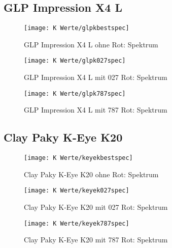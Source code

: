 \documentclass[pagesize,paper=A4,fontsize=12pt,utf8,numbers=noenddot,bibliography=totoc,listof=totoc,DIV=11,BCOR=1mm]{scrreprt}
\begin{document}
\subsection{GLP Impression X4 L}

\begin{figure}[htp]     %
\centering
\texttt{[image: K Werte/glpkbestspec]} 
\caption {GLP Impression X4 L ohne Rot: Spektrum} 
\end{figure}

\begin{figure}[htp]     %
\centering
\texttt{[image: K Werte/glpk027spec]} 
\caption {GLP Impression X4 L mit 027 Rot: Spektrum} 
\end{figure}

\begin{figure}[htp]     %
\centering
\texttt{[image: K Werte/glpk787spec]} 
\caption {GLP Impression X4 L mit 787 Rot: Spektrum} 
\end{figure}


\subsection{Clay Paky K-Eye K20}

\begin{figure}[htp]     %
\centering
\texttt{[image: K Werte/keyekbestspec]} 
\caption {Clay Paky K-Eye K20 ohne Rot: Spektrum} 
\end{figure}

\begin{figure}[htp]     %
\centering
\texttt{[image: K Werte/keyek027spec]} 
\caption {Clay Paky K-Eye K20 mit 027 Rot: Spektrum} 
\end{figure}

\begin{figure}[htp]     %
\centering
\texttt{[image: K Werte/keyek787spec]} 
\caption {Clay Paky K-Eye K20 mit 787 Rot: Spektrum} 
\end{figure}
\end{document}
